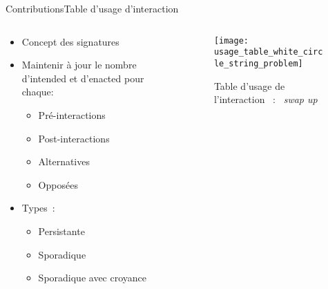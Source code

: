 \documentclass{beamer}
\begin{document}
\begin{frame}{Contributions}{Table d'usage d'interaction}

\begin{minipage}[0.4]{\textwidth}
	\begin{columns}[T]
		\begin{column}{0.5\textwidth}
			\begin{itemize}
				\item Concept des signatures~\citep{simon}
				\item Maintenir à jour le nombre d'intended et d'enacted pour chaque:
				\begin{itemize}
					\item \ns Pré-interactions
					\item \nh Post-interactions
					\item \nse Alternatives
					\item \nse Opposées
				\end{itemize}
				\item \nd Types~:
				\begin{itemize}
					\item Persistante
					\item Sporadique
					\item Sporadique avec croyance
				\end{itemize}
			\end{itemize}
		\end{column}
		\begin{column}{0.4\textwidth}
			\begin{figure}
			\texttt{[image: usage\_table\_white\_circle\_string\_problem]}
			\caption{Table d'usage de l'interaction \whiteCircle~: \og~\emph{swap up}~\fg}
			\end{figure}
		\end{column}
	\end{columns}
\end{minipage}
\end{frame}
\end{document}
